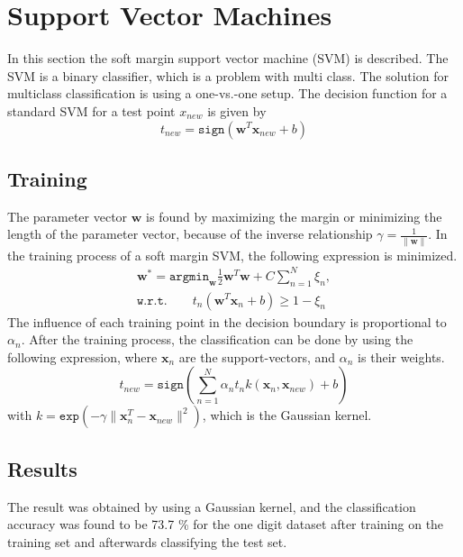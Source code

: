 \section*{Support Vector Machines}
In this section the soft margin support vector machine (SVM) is described. 
The SVM is a binary classifier, which is a problem with multi class. 
The solution for multiclass classification is using a one-vs.-one setup.
The decision function for a standard SVM for a test point $ x_{new} $ is given by
\begin{equation}
t_{new} = \mathtt{sign}(\mathbf{w}^T \mathbf{x}_{new} +b)
\label{eq:SVM_lin}
\end{equation}

\subsection*{Training}
The parameter vector $ \mathbf{w} $ is found by maximizing the margin or minimizing the length of the parameter vector, because of the inverse relationship $ \gamma = \frac{1}{\|\mathbf{w}\|} $.
In the training process of a soft margin SVM, the following expression is minimized. 
\begin{align}
\mathbf{w}^* = 
\mathtt{argmin}_\mathbf{w} \frac{1}{2} \mathbf{w}^T \mathbf{w}+C \sum_{n=1}^{N} \xi_n,\\ \mathtt{w.r.t.} \qquad t_n(\mathbf{w}^T \mathbf{x}_n + b) \geq 1-\xi_n
\end{align} 
The influence of each training point in the decision boundary is proportional to $ \alpha_n $.
After the training process, the classification can be done by using the following expression, where $ \mathbf{x}_n $  are the support-vectors, and $ \alpha_n $ is their weights.
\begin{equation}
t_{new} = 
\mathtt{sign}\left( \sum_{n=1}^{N} \alpha_n t_n k(\mathbf{x}_n,\mathbf{x}_{new}) +b  \right)
\end{equation}
with $ k = \mathtt{exp}(-\gamma \|\mathbf{x}^T_n - \mathbf{x}_{new} \|^2 ) $, which is the Gaussian kernel.

\subsection*{Results}
The result was obtained by using a Gaussian kernel, and the classification accuracy was found to be 73.7 \% for the one digit dataset after training on the training set and afterwards classifying the test set.